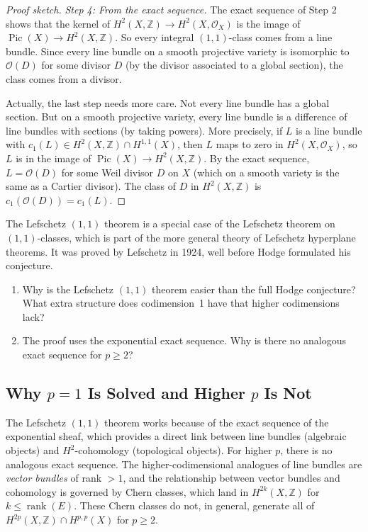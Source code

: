 \begin{proof}[Proof sketch]
\emph{Step 4: From the exact sequence.} The exact sequence of Step 2 shows that the kernel of $H^2(X, \mathbb{Z}) \to H^2(X, \mathcal{O}_X)$ is the image of $\operatorname{Pic}(X) \to H^2(X, \mathbb{Z})$. So every integral $(1,1)$-class comes from a line bundle. Since every line bundle on a smooth projective variety is isomorphic to $\mathcal{O}(D)$ for some divisor $D$ (by the divisor associated to a global section), the class comes from a divisor.

Actually, the last step needs more care. Not every line bundle has a global section. But on a smooth projective variety, every line bundle is a difference of line bundles with sections (by taking powers). More precisely, if $L$ is a line bundle with $c_1(L) \in H^2(X, \mathbb{Z}) \cap H^{1,1}(X)$, then $L$ maps to zero in $H^2(X, \mathcal{O}_X)$, so $L$ is in the image of $\operatorname{Pic}(X) \to H^2(X, \mathbb{Z})$. By the exact sequence, $L = \mathcal{O}(D)$ for some Weil divisor $D$ on $X$ (which on a smooth variety is the same as a Cartier divisor). The class of $D$ in $H^2(X, \mathbb{Z})$ is $c_1(\mathcal{O}(D)) = c_1(L)$.
\end{proof}

\begin{remark}
The Lefschetz $(1,1)$ theorem is a special case of the Lefschetz theorem on $(1,1)$-classes, which is part of the more general theory of Lefschetz hyperplane theorems. It was proved by Lefschetz in 1924, well before Hodge formulated his conjecture.
\end{remark}

\begin{checkyou}
\begin{enumerate}
\item Why is the Lefschetz $(1,1)$ theorem easier than the full Hodge conjecture? What extra structure does codimension~1 have that higher codimensions lack?
\item The proof uses the exponential exact sequence. Why is there no analogous exact sequence for $p \ge 2$?
\end{enumerate}
\end{checkyou}

\subsection{Why $p = 1$ Is Solved and Higher $p$ Is Not}

The Lefschetz $(1,1)$ theorem works because of the exact sequence of the exponential sheaf, which provides a direct link between line bundles (algebraic objects) and $H^2$-cohomology (topological objects). For higher $p$, there is no analogous exact sequence. The higher-codimensional analogues of line bundles are \emph{vector bundles} of rank $> 1$, and the relationship between vector bundles and cohomology is governed by Chern classes, which land in $H^{2k}(X, \mathbb{Z})$ for $k \le \operatorname{rank}(E)$. These Chern classes do not, in general, generate all of $H^{2p}(X, \mathbb{Z}) \cap H^{p,p}(X)$ for $p \ge 2$.

